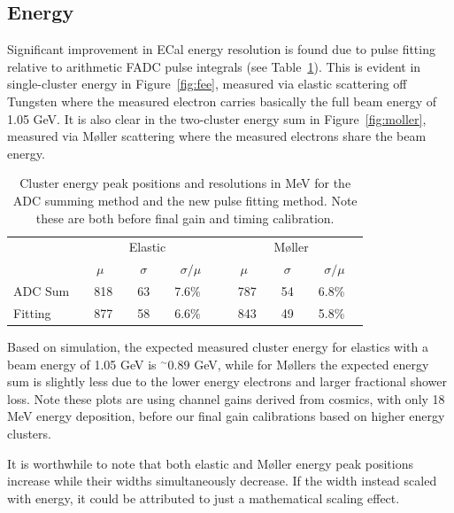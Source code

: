 \documentclass[amsmath,amssymb,notitlepage,12pt]{revtex4-1}
\begin{document}
\subsection{Energy}
Significant improvement in ECal energy resolution is found due to pulse fitting relative to arithmetic FADC pulse integrals (see Table~\ref{tab:reso}).  This is evident in single-cluster energy in Figure~\ref{fig:fee}, measured via elastic scattering off Tungsten where the measured electron carries basically the full beam energy of 1.05 GeV.  It is also clear in the two-cluster energy sum in Figure~\ref{fig:moller}, measured via M\o ller scattering where the measured electrons share the beam energy.
\begin{table}[htbp]\centering
  \begin{tabular}{lccc|ccc}\cmidrule[1.5pt]{1-7}
    & \multicolumn{3}{c}{Elastic} & \multicolumn{3}{|c}{M\o ller} \\\cmidrule[1pt]{2-7}
    & $\mu$ & $\sigma$ & $\sigma/\mu$ & $\mu$ & $\sigma$ & $\sigma/\mu$ \\\cmidrule[1.5pt]{1-7}
    \multicolumn{1}{l}{ADC Sum} &\ \ 818\ &\ 63\ &\ 7.6\%\ \ &\ \ 787\ &\ 54\ &\ 6.8\%\ \ \\
    \multicolumn{1}{l}{Fitting} &\ \ 877\ &\ 58\ &\ 6.6\%\ \ &\ \ 843\ &\ 49\ &\ 5.8\%\ \ \\
    \bottomrule[1.5pt]
  \end{tabular}
  \caption{Cluster energy peak positions and resolutions in MeV for the ADC summing method and the new pulse fitting method.  Note these are both before final gain and timing calibration.\label{tab:reso}}
\end{table}

Based on simulation, the expected measured cluster energy for elastics with a beam energy of 1.05 GeV is $^\sim$0.89 GeV, while for M\o llers the expected energy sum is slightly less due to the lower energy electrons and larger fractional shower loss.  Note these plots are using channel gains derived from cosmics, with only 18 MeV energy deposition, before our final gain calibrations based on higher energy clusters.

It is worthwhile to note that both elastic and M\o ller energy peak positions increase while their widths simultaneously decrease.  If the width instead scaled with energy, it could be attributed to just a mathematical scaling effect.
\end{document}
